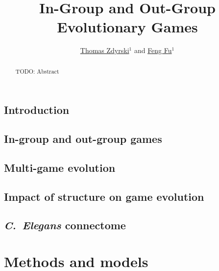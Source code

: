\documentclass[openacc]{class/rsprocb_new}
\begin{document}
\title{In-Group and Out-Group Evolutionary Games}

\author{
\href{https://orcid.org/0000-0003-3039-172X}{Thomas Zdyrski}$^{1}$
and
\href{https://orcid.org/0000-0001-8252-1990}{Feng Fu}$^{1}$
}

\address{$^{1}$Department of Mathematics, Dartmouth College, Hanover, NH 03755
}

\subject{xxxxx, xxxxx, xxxx}



\begin{abstract}
TODO: Abstract
\absbreak
\end{abstract}

\begin{fmtext}
\tableofcontents
\section{Introduction}
\subsection{In-group and out-group games}
\subsection{Multi-game evolution}
\subsection{Impact of structure on game evolution}
\subsection{\emph{C.\ Elegans} connectome}
\end{fmtext}


\maketitle
\section{Methods and models}
\end{document}
